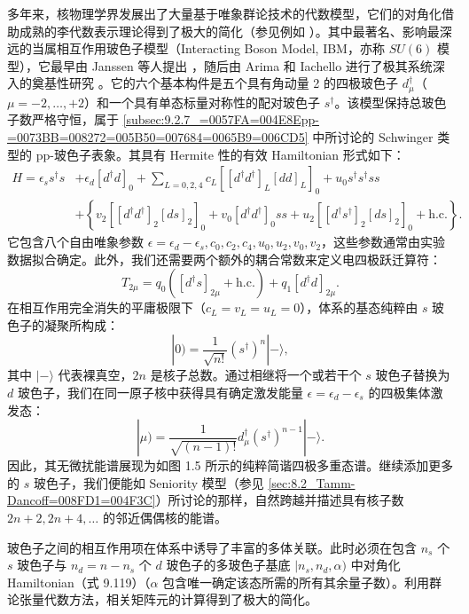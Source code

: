 多年来，核物理学界发展出了大量基于唯象群论技术的代数模型，它们的对角化借助成熟的李代数表示理论得到了极大的简化（参见例如 \cite{HNL70,DDK70,VNR75,RD76,RGB77}）。其中最著名、影响最深远的当属相互作用玻色子模型（Interacting
Boson Model, IBM，亦称 $SU(6)$ 模型），它最早由 Janssen 等人提出 \cite{JJD74}，随后由
Arima 和 Iachello 进行了极其系统深入的奠基性研究 \cite{AI75a,AI75b}。它的六个基本构件是五个具有角动量
2 的四极玻色子 $d^{\dagger}_{\mu}$（$\mu=-2,\ldots,+2$）和一个具有单态标量对称性的配对玻色子
$s^{\dagger}$。该模型保持总玻色子数严格守恒，属于 \ref{subsec:9.2.7_=0057FA=004E8Epp-=0073BB=008272=005B50=007684=0065B9=006CD5}
中所讨论的 Schwinger 类型的 pp-玻色子表象。其具有 Hermite 性的有效 Hamiltonian 形式如下：
\begin{align}
H=\epsilon_{s}s^{\dagger}s & +\epsilon_{d}[d^{\dagger}d]_{0}+\sum_{L=0,2,4}c_{L}[[d^{\dagger}d^{\dagger}]_{L}[dd]_{L}]_{0}+u_{0}s^{\dagger}s^{\dagger}ss\nonumber \\
 & +\left\{ v_{2}[[d^{\dagger}d^{\dagger}]_{2}[ds]_{2}]_{0}+v_{0}[d^{\dagger}d^{\dagger}]_{0}ss+u_{2}[[d^{\dagger}s^{\dagger}]_{2}[ds]_{2}]_{0}+\text{h.c.}\right\} .\label{eq:9.119}
\end{align}
它包含八个自由唯象参数 $\epsilon=\epsilon_{d}-\epsilon_{s},c_{0},c_{2},c_{4},u_{0},u_{2},v_{0},v_{2}$，这些参数通常由实验数据拟合确定。此外，我们还需要两个额外的耦合常数来定义电四极跃迁算符：
\begin{equation}
T_{2\mu}=q_{0}\left([d^{\dagger}s]_{2\mu}+\text{h.c.}\right)+q_{1}[d^{\dagger}d]_{2\mu}.\label{eq:9.120}
\end{equation}
在相互作用完全消失的平庸极限下（$c_{L}=v_{L}=u_{L}=0$），体系的基态纯粹由 $s$ 玻色子的凝聚所构成：
\[
|0)=\frac{1}{\sqrt{n!}}(s^{\dagger})^{n}|-\rangle,
\]
其中 $|-\rangle$ 代表裸真空，$2n$ 是核子总数。通过相继将一个或若干个 $s$ 玻色子替换为 $d$ 玻色子，我们在同一原子核中获得具有确定激发能量
$\epsilon=\epsilon_{d}-\epsilon_{s}$ 的四极集体激发态：
\[
|\mu)=\frac{1}{\sqrt{(n-1)!}}d^{\dagger}_{\mu}(s^{\dagger})^{n-1}|-\rangle.
\]
因此，其无微扰能谱展现为如图 1.5 所示的纯粹简谐四极多重态谱。继续添加更多的 $s$ 玻色子，我们便能如 Seniority
模型（参见 \ref{sec:8.2_Tamm-Dancoff=008FD1=004F3C}）所讨论的那样，自然跨越并描述具有核子数
$2n+2,2n+4,\ldots$ 的邻近偶偶核的能谱。

玻色子之间的相互作用项在体系中诱导了丰富的多体关联。此时必须在包含 $n_{s}$ 个 $s$ 玻色子与 $n_{d}=n-n_{s}$
个 $d$ 玻色子的多玻色子基底 $|n_{s},n_{d},\alpha)$ 中对角化 Hamiltonian（式 9.119）（$\alpha$
包含唯一确定该态所需的所有其余量子数）。利用群论张量代数方法，相关矩阵元的计算得到了极大的简化。

